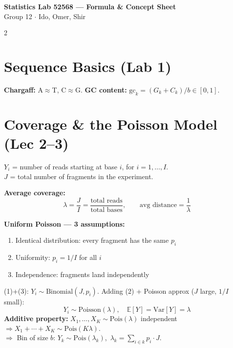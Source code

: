 \documentclass[12pt,a4paper]{article}
\newcommand{\E}{\mathbb{E}}
\newcommand{\Var}{\mathrm{Var}}
\newcommand{\gc}{\text{gc}}
\begin{document}
\begin{center}
  {\large\bfseries Statistics Lab 52568 — Formula \& Concept Sheet}\\[1pt]
  {\small Group 12 $\cdot$ Ido, Omer, Shir}
\end{center}
\vspace{-6pt}
\begin{multicols}{2}

\section*{Sequence Basics (Lab 1)}

\textbf{Chargaff:} A$\approx$T, C$\approx$G. \quad \textbf{GC content:} $\gc_k = (G_k+C_k)/b \in[0,1]$.

\section*{Coverage \& the Poisson Model (Lec 2--3)}

$Y_i$ = number of reads starting at base $i$, for $i=1,\ldots,I$.\\
$J$ = total number of fragments in the experiment.

\textbf{Average coverage:}
\[
  \lambda = \frac{J}{I} = \frac{\text{total reads}}{\text{total bases}}, \qquad
  \text{avg distance} = \frac{1}{\lambda}
\]

\textbf{Uniform Poisson — 3 assumptions:}
\begin{enumerate}[leftmargin=*, itemsep=0pt, topsep=1pt]
  \item Identical distribution: every fragment has the same $p_i$
  \item Uniformity: $p_i = 1/I$ for all $i$
  \item Independence: fragments land independently
\end{enumerate}
(1)+(3): $Y_i \sim \text{Binomial}(J, p_i)$.
Adding (2) + Poisson approx ($J$ large, $1/I$ small):
\[
  Y_i \sim \text{Poisson}(\lambda), \quad
  \E[Y] = \Var[Y] = \lambda
\]
\textbf{Additive property:} $X_1,\ldots,X_K \sim \text{Pois}(\lambda)$ independent
$\Rightarrow X_1+\cdots+X_K \sim \text{Pois}(K\lambda)$. \\
$\Rightarrow$ Bin of size $b$: $Y_k \sim \text{Pois}(\lambda_k)$,\ $\lambda_k = \sum_{i \in k} p_i \cdot J$.


\end{multicols}
\end{document}

